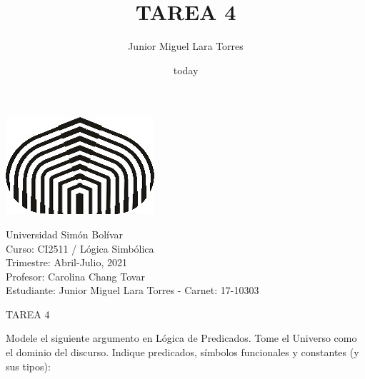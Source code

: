 \documentclass[a4paper,12pt]{article}
\title{TAREA 4}
\author{Junior Miguel Lara Torres}
\date{today}
\begin{document}
\begin{center}
\par \includegraphics[scale=1]{USB} \par
Universidad Simón Bolívar \\ Curso: CI2511 / Lógica Simbólica \\ Trimestre: Abril-Julio, 2021 \\ Profesor: Carolina Chang Tovar \\ Estudiante: Junior Miguel Lara Torres - Carnet: 17-10303 \\
\end{center}

\begin{center}
TAREA 4
\end{center}

Modele el siguiente argumento en Lógica de Predicados. Tome el Universo como el dominio del discurso. Indique predicados,  símbolos funcionales y constantes (y sus tipos): \\
\end{document}
